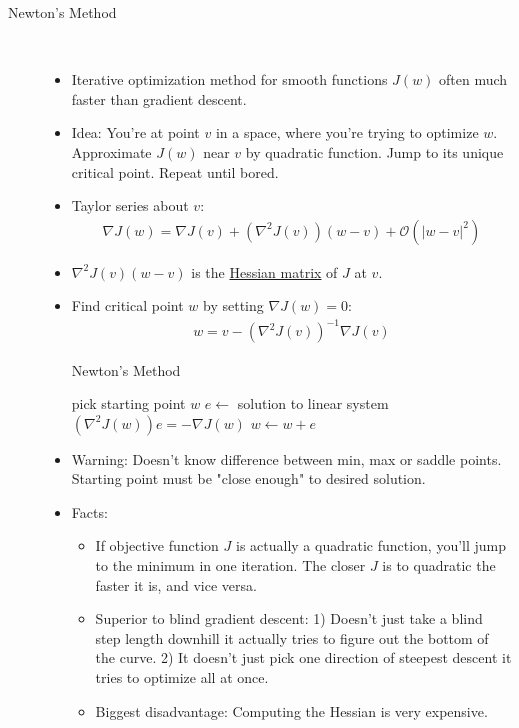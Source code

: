 \documentclass[10pt]{article}
\begin{document}
\begin{description}
	\item[Newton's Method]
	\
		\begin{itemize}
			\item Iterative optimization method for smooth functions $J(w)$ often much faster than gradient descent.
			\item Idea: You're at point $v$ in a space, where you're trying to optimize $w$. Approximate $J(w)$ near $v$ by quadratic function. Jump to its unique critical point. Repeat until bored.
			\item Taylor series about $v$:
				\begin{align*}
					\nabla J(w) = \nabla J(v) + (\nabla^{2}J(v))(w-v) + \mathcal{O}(|w - v|^{2})
				\end{align*}
			\item $\nabla^{2}J(v)(w-v)$ is the \underline{Hessian matrix} of $J$ at $v$.
			\item Find critical point $w$ by setting $\nabla J(w) = 0$:
				\begin{align*}
					w = v - (\nabla^{2}J(v))^{-1}\nabla J(v)
				\end{align*} 
				\begin{algorithm*}
					\caption{Newton's Method}
					\begin{algorithmic}
						\State pick starting point $w$
						\State $e \leftarrow$ solution to linear system $(\nabla^{2}J(w))e = -\nabla J(w)$
						\State $w \leftarrow w + e$
						\EndWhile
					\end{algorithmic}
				\end{algorithm*}
			\item Warning: Doesn't know difference between min, max or saddle points. Starting point must be "close enough" to desired solution.
			\item Facts:
				\begin{itemize}
					\item If objective function $J$ is actually a quadratic function, you'll jump to the minimum in one iteration. The closer $J$ is to quadratic the faster it is, and vice versa.
					\item Superior to blind gradient descent: 1) Doesn't just take a blind step length downhill it actually tries to figure out the bottom of the curve. 2) It doesn't just pick one direction of steepest descent it tries to optimize all at once.
					\item Biggest disadvantage: Computing the Hessian is very expensive. 
				\end{itemize}
		\end{itemize}
		

\end{description}
\end{document}
